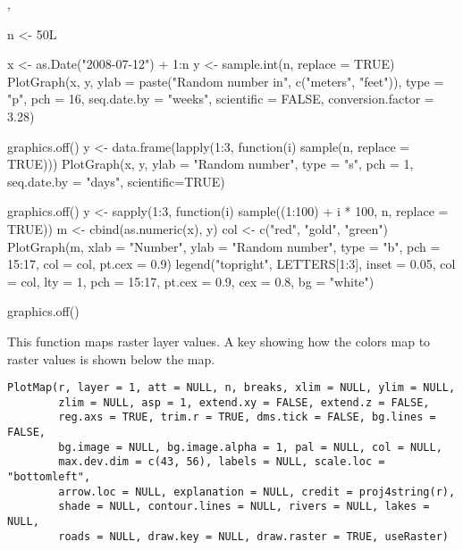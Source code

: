 \documentclass[letterpaper]{book}
\begin{document}
%
\begin{SeeAlso}\relax
{}, 
\end{SeeAlso}
%
\begin{Examples}
\begin{ExampleCode}
n <- 50L

x <- as.Date("2008-07-12") + 1:n
y <- sample.int(n, replace = TRUE)
PlotGraph(x, y, ylab = paste("Random number in", c("meters", "feet")), type = "p",
          pch = 16, seq.date.by = "weeks", scientific = FALSE, conversion.factor = 3.28)

graphics.off()
y <- data.frame(lapply(1:3, function(i) sample(n, replace = TRUE)))
PlotGraph(x, y, ylab = "Random number", type = "s", pch = 1, seq.date.by = "days",
          scientific=TRUE)

graphics.off()
y <- sapply(1:3, function(i) sample((1:100) + i * 100, n, replace = TRUE))
m <- cbind(as.numeric(x), y)
col <- c("red", "gold", "green")
PlotGraph(m, xlab = "Number", ylab = "Random number", type = "b", pch = 15:17,
          col = col, pt.cex = 0.9)
legend("topright", LETTERS[1:3], inset = 0.05, col = col, lty = 1, pch = 15:17,
       pt.cex = 0.9, cex = 0.8, bg = "white")

graphics.off()
\end{ExampleCode}
\end{Examples}
%
\begin{Description}\relax
This function maps raster layer values. A key showing how the colors map to raster values is shown below the map.
\end{Description}
%
\begin{Usage}
\begin{verbatim}
PlotMap(r, layer = 1, att = NULL, n, breaks, xlim = NULL, ylim = NULL,
        zlim = NULL, asp = 1, extend.xy = FALSE, extend.z = FALSE,
        reg.axs = TRUE, trim.r = TRUE, dms.tick = FALSE, bg.lines = FALSE,
        bg.image = NULL, bg.image.alpha = 1, pal = NULL, col = NULL,
        max.dev.dim = c(43, 56), labels = NULL, scale.loc = "bottomleft",
        arrow.loc = NULL, explanation = NULL, credit = proj4string(r),
        shade = NULL, contour.lines = NULL, rivers = NULL, lakes = NULL,
        roads = NULL, draw.key = NULL, draw.raster = TRUE, useRaster)
\end{verbatim}
\end{Usage}
%
\end{document}
